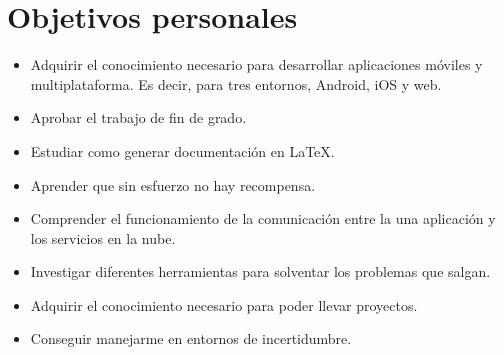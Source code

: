 \section{Objetivos personales}
\begin{itemize}
	\item Adquirir el conocimiento necesario para desarrollar aplicaciones móviles y multiplataforma. Es decir, para tres entornos, Android, iOS y web.
	\item Aprobar el trabajo de fin de grado.
	\item Estudiar como generar documentación en \LaTeX.
	\item Aprender que sin esfuerzo no hay recompensa.
	\item Comprender el funcionamiento de la comunicación entre la una aplicación y los servicios en la nube.
	\item Investigar diferentes herramientas para solventar los problemas que salgan.
	\item Adquirir el conocimiento necesario para poder llevar proyectos.
	\item Conseguir manejarme en entornos de incertidumbre.
\end{itemize}